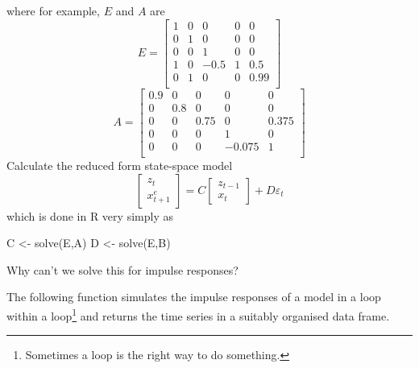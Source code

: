 \documentclass[
  letterpaper,
]{book}
\newenvironment{Shaded}{\begin{snugshade}}{\end{snugshade}}
\newcommand{\FunctionTok}[1]{\textcolor[rgb]{0.28,0.35,0.67}{#1}}
\newcommand{\NormalTok}[1]{\textcolor[rgb]{0.00,0.23,0.31}{#1}}
\newcommand{\OtherTok}[1]{\textcolor[rgb]{0.00,0.23,0.31}{#1}}
\begin{document}
where for example, \(E\) and \(A\) are \[  
E = \left[\begin{array}{r}1 &0 &0 &0 &0 \\0 &1 &0 &0 &0 \\0 &0 &1 &0 &0 \\1 &0 &-0.5 &1 &0.5 \\0 &1 &0 &0 &0.99 \\\end{array}\right] 
\] \[  
A = \left[\begin{array}{r}0.9 &0 &0 &0 &0 \\0 &0.8 &0 &0 &0 \\0 &0 &0.75 &0 &0.375 \\0 &0 &0 &1 &0 \\0 &0 &0 &-0.075 &1 \\\end{array}\right] 
\] Calculate the reduced form state-space model \[
\begin{bmatrix} z_t \\ x_{t+1}^e \end{bmatrix} = C \begin{bmatrix} z_{t-1} \\ x_t \end{bmatrix} + D \varepsilon_t  
\] which is done in R very simply as

\begin{Shaded}
\begin{Highlighting}[]
\NormalTok{C }\OtherTok{\textless{}{-}} \FunctionTok{solve}\NormalTok{(E,A)}
\NormalTok{D }\OtherTok{\textless{}{-}} \FunctionTok{solve}\NormalTok{(E,B)}
\end{Highlighting}
\end{Shaded}

Why can't we solve this for impulse responses?

The following function simulates the impulse responses of a model in a
loop within a loop\footnote{Sometimes a loop is the right way to do
  something.} and returns the time series in a suitably organised data
frame.
\end{document}
